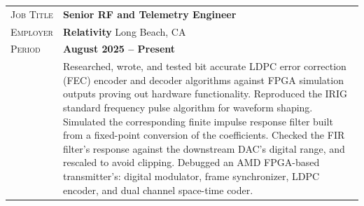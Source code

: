 \documentclass[a4paper, oneside, final]{scrartcl}
\newcommand{\gray}{\rowcolor[gray]{.90}} %
\begin{document}
\begin{center}
\begin{tabularx}{0.97\linewidth}{>{\raggedleft\scshape}p{2cm}X}
\gray Job Title & \textbf{Senior RF and Telemetry Engineer}\\
\gray Employer & \textbf{Relativity} \hfill Long Beach, CA\\
\gray Period & \textbf{August 2025 -- Present}\\
&
\vspace{-0.15 cm}
Researched, wrote, and tested bit accurate LDPC error correction (FEC) encoder and decoder algorithms against FPGA simulation outputs proving out hardware functionality. Reproduced the IRIG standard frequency pulse algorithm for waveform shaping.  Simulated the corresponding finite impulse response filter built from a fixed-point conversion of the coefficients.  Checked the FIR filter’s response against the downstream DAC’s digital range, and rescaled to avoid clipping.   
\newline
\newline
Debugged an AMD FPGA-based transmitter's: digital modulator, frame synchronizer, LDPC encoder, and dual channel space-time coder.
\newline
\end{tabularx}



\end{center}
\end{document}
